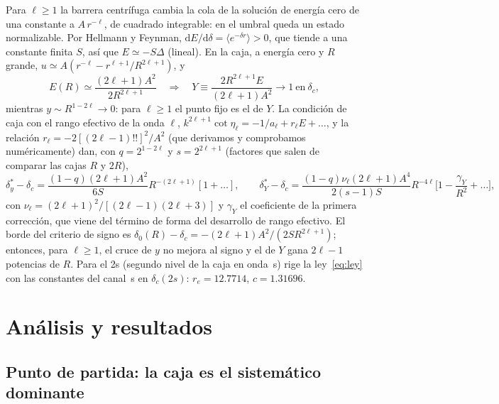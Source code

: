 \documentclass[10pt,letterpaper]{article}
\newcommand{\dc}{\delta_c}
\newcommand{\dd}{\mathrm{d}}
\begin{document}
Para $\ell\ge1$ la barrera centrífuga cambia la cola de la solución de energía cero de una constante a $A\,r^{-\ell}$, de cuadrado integrable: en el umbral queda un estado normalizable. Por Hellmann y Feynman, $\dd E/\dd\delta=\langle e^{-\delta r}\rangle>0$, que tiende a una constante finita $S$, así que $E\simeq-S\Delta$ (lineal). En la caja, a energía cero y $R$ grande, $u\simeq A(r^{-\ell}-r^{\ell+1}/R^{2\ell+1})$, y
\begin{equation}
E(R)\simeq\frac{(2\ell+1)A^2}{2R^{2\ell+1}}\quad\Rightarrow\quad Y\equiv\frac{2R^{2\ell+1}E}{(2\ell+1)A^2}\to1\ \text{en}\ \dc,\label{eq:Y}
\end{equation}
mientras $y\sim R^{1-2\ell}\to0$: para $\ell\ge1$ el punto fijo es el de $Y$. La condición de caja con el rango efectivo de la onda $\ell$, $k^{2\ell+1}\cot\eta_\ell=-1/a_\ell+r_\ell E+\dots$, y la relación $r_\ell=-2[(2\ell-1)!!]^2/A^2$ (que derivamos y comprobamos numéricamente) dan, con $q=2^{1-2\ell}$ y $s=2^{2\ell+1}$ (factores que salen de comparar las cajas $R$ y $2R$),
\begin{equation}
\delta^*_y-\dc=\frac{(1-q)(2\ell+1)A^2}{6S}R^{-(2\ell+1)}[1+\dots],\qquad
\delta^*_Y-\dc=\frac{(1-q)\nu_\ell(2\ell+1)A^4}{2(s-1)S}R^{-4\ell}\Big[1-\frac{\gamma_Y}{R^2}+\dots\Big],\label{eq:cruce_l}
\end{equation}
con $\nu_\ell=(2\ell+1)^2/[(2\ell-1)(2\ell+3)]$ y $\gamma_Y$ el coeficiente de la primera corrección, que viene del término de forma del desarrollo de rango efectivo. El borde del criterio de signo es $\delta_0(R)-\dc=-(2\ell+1)A^2/(2SR^{2\ell+1})$; entonces, para $\ell\ge1$, el cruce de $y$ no mejora al signo y el de $Y$ gana $2\ell-1$ potencias de $R$. Para el 2s (segundo nivel de la caja en onda~s) rige la ley~\eqref{eq:ley} con las constantes del canal~s en $\dc(2s)$: $r_e=12.7714$, $c=1.31696$.

\section{Análisis y resultados}
\subsection{Punto de partida: la caja es el sistemático dominante}
\end{document}
